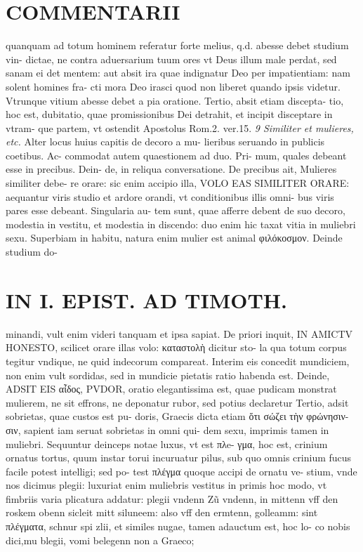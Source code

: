 \documentclass{article}
\begin{document}
\begin{pages}
\section*{COMMENTARII }
\marginpar{[ p.5 ]}\pstart quanquam ad totum hominem referatur forte melius, q.d. abesse debet studium vin- dictae, ne contra aduersarium tuum ores vt Deus illum male perdat, sed sanam ei det mentem: aut absit ira quae indignatur Deo per impatientiam: nam solent homines fra- cti mora Deo irasci quod non liberet quando ipsis videtur. Vtrunque vitium abesse debet a pia oratione. Tertio, absit etiam discepta- tio, hoc est, dubitatio, quae promissionibus Dei detrahit, et incipit disceptare in vtram- que partem, vt ostendit Apostolus Rom.2. ver.15.  \pend
\textit{9 Similiter et mulieres, etc. }\pstart Alter locus huius capitis de decoro a mu- lieribus seruando in publicis coetibus. Ac- commodat autem quaestionem ad duo. Pri- mum, quales debeant esse in precibus. Dein- de, in reliqua conversatione.  \pend\pstart De precibus ait, Mulieres similiter debe- re orare: sic enim accipio illa, VOLO EAS SIMILITER ORARE: aequantur viris studio et ardore orandi, vt conditionibus illis omni- bus viris pares esse debeant. Singularia au- tem sunt, quae afferre debent de suo decoro, modestia in vestitu, et modestia in discendo: duo enim hic taxat vitia in muliebri sexu. Superbiam in habitu, natura enim mulier est animal φιλόκοσμον. Deinde studium do-  \pend
\section*{IN I. EPIST. AD TIMOTH. }
\marginpar{[ p.55 ]}\pstart minandi, vult enim videri tanquam et ipsa sapiat.  \pend\pstart De priori inquit, IN AMICTV HONESTO, scilicet orare illas volo: καταστολὴ dicitur sto- la qua totum corpus tegitur vndique, ne quid indecorum compareat. Interim eis concedit mundiciem, non enim vult sordidas, sed in mundicie pietatis ratio habenda est.  \pend\pstart Deinde, ADSIT EIS αἶδος, PVDOR, oratio elegantissima est, quae pudicam monstrat mulierem, ne sit effrons, ne deponatur rubor, sed potius declaretur  \pend\pstart Tertio, adsit sobrietas, quae custos est pu- doris, Graecis dicta etiam ὅτι σώζει τὴν φρώνησιν- σιν, sapient iam seruat sobrietas in omni qui- dem sexu, imprimis tamen in muliebri.  \pend\pstart Sequuntur deinceps notae luxus, vt est πλe- γμα, hoc est, crinium ornatus tortus, quum instar torui incuruatur pilus, sub quo omnis crinium fucus facile potest intelligi; sed po- test πλέγμα quoque accipi de ornatu ve- stium, vnde nos dicimus plegii: luxuriat enim muliebris vestitus in primis hoc modo, vt fimbriis varia plicatura addatur: plegii vndenn Zũ vndenn, in mittenn vff den roskem obenn sicleit mitt siluneem: also vff den ermtenn, golleamm: sint πλέγματα, schnur spi zlii, et similes nugae, tamen adauctum est, hoc lo- co nobis dici,mu blegii, vomi belegenn non a Graeco;  \pend

\end{pages}
\end{document}
